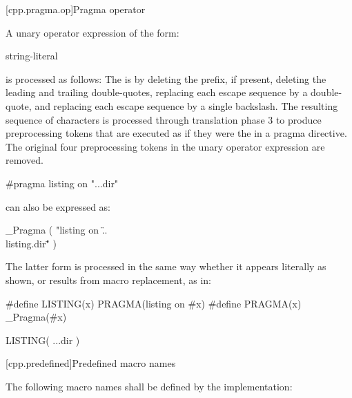 [cpp.pragma.op]{Pragma operator}%
%

\pnum
A unary operator expression of the form:
\begin{ncbnf}
 \terminal{(} string-literal \terminal{)}
\end{ncbnf}
is processed as follows: The  is 
by deleting the  prefix, if present, deleting the leading and trailing
double-quotes, replacing each escape sequence  by a double-quote, and
replacing each escape sequence \tcode{\textbackslash\textbackslash} by a single
backslash. The resulting sequence of characters is processed through translation phase 3
to produce preprocessing tokens that are executed as if they were the
 in a pragma directive. The original four preprocessing
tokens in the unary operator expression are removed.

\pnum
\begin{example}
\begin{codeblock}
#pragma listing on "..\listing.dir"
\end{codeblock}
can also be expressed as:
\begin{codeblock}
_Pragma ( "listing on \"..\\listing.dir\"" )
\end{codeblock}
The latter form is processed in the same way whether it appears literally
as shown, or results from macro replacement, as in:
\begin{codeblock}
#define LISTING(x) PRAGMA(listing on #x)
#define PRAGMA(x) _Pragma(#x)

LISTING( ..\listing.dir )
\end{codeblock}
\end{example}

[cpp.predefined]{Predefined macro names}
%

\pnum
The following macro names shall be defined by the implementation:


